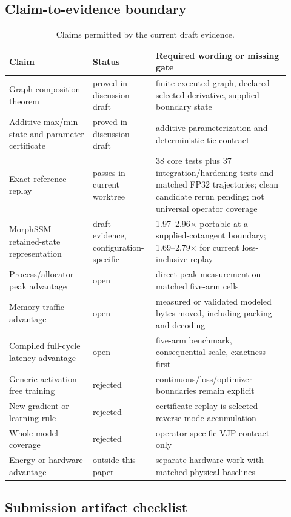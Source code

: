 \subsection{Claim-to-evidence boundary}

\begin{table}[ht]
\centering
\caption{Claims permitted by the current draft evidence.}
\small
\begin{tabular}{L{0.29\linewidth}L{0.18\linewidth}L{0.45\linewidth}}
\toprule
Claim & Status & Required wording or missing gate \\
\midrule
Graph composition theorem & proved in discussion draft & finite executed graph, declared selected derivative, supplied boundary state \\
Additive max/min state and parameter certificate & proved in discussion draft & additive parameterization and deterministic tie contract \\
Exact reference replay & passes in current worktree & 38 core tests plus 37 integration/hardening tests and matched FP32 trajectories; clean candidate rerun pending; not universal operator coverage \\
MorphSSM retained-state representation & draft evidence, configuration-specific & 1.97--2.96$\times$ portable at a supplied-cotangent boundary; 1.69--2.79$\times$ for current loss-inclusive replay \\
Process/allocator peak advantage & open & direct peak measurement on matched five-arm cells \\
Memory-traffic advantage & open & measured or validated modeled bytes moved, including packing and decoding \\
Compiled full-cycle latency advantage & open & five-arm benchmark, consequential scale, exactness first \\
Generic activation-free training & rejected & continuous/loss/optimizer boundaries remain explicit \\
New gradient or learning rule & rejected & certificate replay is selected reverse-mode accumulation \\
Whole-model coverage & rejected & operator-specific VJP contract only \\
Energy or hardware advantage & outside this paper & separate hardware work with matched physical baselines \\
\bottomrule
\end{tabular}
\end{table}

\clearpage
\subsection{Submission artifact checklist}

